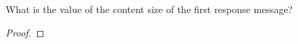 \documentclass[../../main.tex]{subfiles}
\begin{document}
\begin{wts}
What is the value of the content size of the first response message?
\end{wts}
\begin{proof}

\end{proof}
\end{document}
